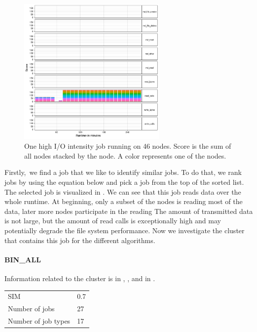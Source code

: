 \documentclass[]{llncs}
\begin{document}
\begin{figure}[h]
  \centering
  \includegraphics[width=2.84in,height=2.85in]{./media/image1.png}
  \caption{One high I/O intensity job running on 46 nodes. Score is the sum of all nodes stacked by the node. A color represents one of the nodes.}
  \label{fig:use_case}
\end{figure}

Firstly,\ we find a job that we like to identify similar jobs.
To do that, we rank jobs by using the equation below and pick a job from the top of the sorted list.
The selected job is visualized in .
We can see that this job reads data over the whole runtime.
At beginning, only a subset of the nodes is reading most of the data, later more nodes participate in the reading The amount of transmitted data is not large, but the amount of read calls is exceptionally high and may potentially degrade the file system performance.
Now we investigate the cluster that contains this job for the different algorithms.

\paragraph{BIN\_ALL}
Information related to the cluster is in , , and in .

\begingroup
  \centering
  \begin{tabular}{ll}
    SIM & 0.7 \\
    Number of jobs & 27 \\
    Number of job types & 17 \\
  \end{tabular}
  \label{tab:use_case:bin_all:stats}
\endgroup
\end{document}
